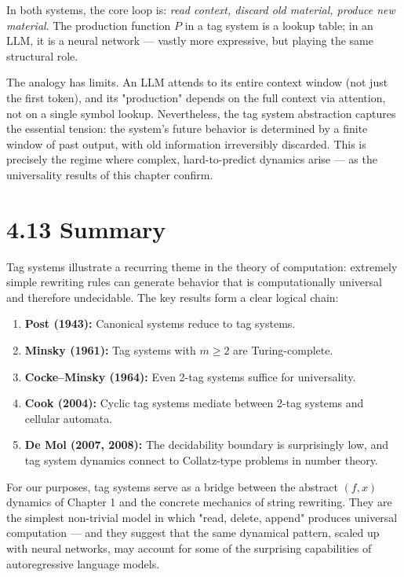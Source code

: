 In both systems, the core loop is: \textit{read context, discard old material, produce new material}. The production function $P$ in a tag system is a lookup table; in an LLM, it is a neural network --- vastly more expressive, but playing the same structural role.

The analogy has limits. An LLM attends to its entire context window (not just the first token), and its "production" depends on the full context via attention, not on a single symbol lookup. Nevertheless, the tag system abstraction captures the essential tension: the system's future behavior is determined by a finite window of past output, with old information irreversibly discarded. This is precisely the regime where complex, hard-to-predict dynamics arise --- as the universality results of this chapter confirm.

\section{4.13 Summary}

Tag systems illustrate a recurring theme in the theory of computation: extremely simple rewriting rules can generate behavior that is computationally universal and therefore undecidable. The key results form a clear logical chain:

\begin{enumerate}
  \item \textbf{Post (1943):} Canonical systems reduce to tag systems.
  \item \textbf{Minsky (1961):} Tag systems with $m \geq 2$ are Turing-complete.
  \item \textbf{Cocke--Minsky (1964):} Even 2-tag systems suffice for universality.
  \item \textbf{Cook (2004):} Cyclic tag systems mediate between 2-tag systems and cellular automata.
  \item \textbf{De Mol (2007, 2008):} The decidability boundary is surprisingly low, and tag system dynamics connect to Collatz-type problems in number theory.
\end{enumerate}

For our purposes, tag systems serve as a bridge between the abstract $(f, x)$ dynamics of Chapter 1 and the concrete mechanics of string rewriting. They are the simplest non-trivial model in which "read, delete, append" produces universal computation --- and they suggest that the same dynamical pattern, scaled up with neural networks, may account for some of the surprising capabilities of autoregressive language models.

